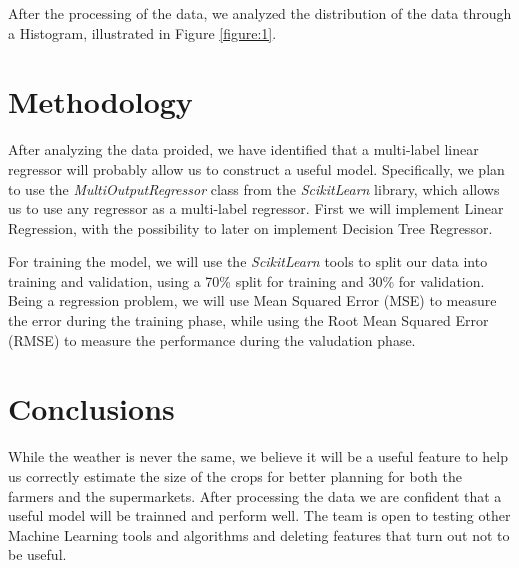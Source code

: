\documentclass{article}
\begin{document}
After the processing of the data, we analyzed the distribution of the data through a Histogram, illustrated
in Figure \ref*{figure:1}.

\section{Methodology}

After analyzing the data proided, we have identified that a multi-label linear regressor will probably allow
us to construct a useful model. Specifically, we plan to use the \emph{MultiOutputRegressor} class from
the \emph{ScikitLearn} library, which allows us to use any regressor as a multi-label regressor. First we
will implement Linear Regression, with the possibility to later on implement Decision Tree Regressor.

For training the model, we will use the \emph{ScikitLearn} tools to split our data into training and validation,
using a 70\% split for training and 30\% for validation. Being a regression problem, we will use Mean Squared Error
(MSE) to measure the error during the training phase, while using the Root Mean Squared Error (RMSE) to measure
the performance during the valudation phase.

\section{Conclusions}
While the weather is never the same, we believe it will be a useful feature to help us correctly estimate
the size of the crops for better planning for both the farmers and the supermarkets. After processing the data
we are confident that a useful model will be trainned and perform well. The team is open to testing other
Machine Learning tools and algorithms and deleting features that turn out not to be useful.



\end{document}
